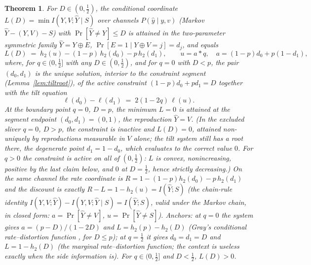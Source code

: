 \documentclass[11pt,onecolumn]{IEEEtran}
\newtheorem{theorem}{Theorem}
\newcommand{\hY}{\widehat{Y}}
\begin{document}
\begin{theorem}
\label{thm:binary}
For $D\in(0,\tfrac12)$, the conditional coordinate
$L(D)=\min I(Y,V;\hY\mid S)$ over channels $P(\hat y\mid y,v)$
(Markov $\hY-(Y,V)-S$) with $\Pr[\hY\ne Y]\le D$ is attained in
the two-parameter symmetric family $\hY=Y\oplus E$,
$\Pr[E=1\mid Y\oplus V=j]=d_j$, and equals
\[
L(D)\;=\;h_2(u)-(1-p)\,h_2(d_0)-p\,h_2(d_1),\qquad
u=a*q,\quad a=(1-p)d_0+p(1-d_1),
\]
where, for $q\in(0,\tfrac12]$ with any $D\in(0,\tfrac12)$, and for $q=0$
with $D<p$, the pair $(d_0,d_1)$ is the \emph{unique} solution, interior
to the constraint segment (Lemma~\ref{lem:tiltroot}), of the active
constraint $(1-p)d_0+pd_1=D$ together with the \emph{tilt equation}
\[
\ell(d_0)-\ell(d_1)\;=\;2(1-2q)\,\ell(u).
\]
At the boundary point $q=0$, $D=p$, the minimum $L=0$ is attained at
the segment endpoint $(d_0,d_1)=(0,1)$, the reproduction
$\hY=V$.
(In the excluded sliver $q=0$, $D>p$, the constraint is inactive and
$L(D)=0$, attained non-uniquely by reproductions measurable in $V$ alone; the
tilt system still has a root there, the degenerate point $d_1=1-d_0$,
which evaluates to the correct value $0$. For $q>0$ the constraint is
active on all of $(0,\tfrac12)$: $L$ is convex, nonincreasing, positive
by the last claim below, and $0$ at $D=\tfrac12$, hence strictly
decreasing.)
On the same channel the rate coordinate is $R=1-(1-p)h_2(d_0)-p\,h_2(d_1)$
and the discount is exactly $R-L=1-h_2(u)=I(\hY;S)$ (the chain-rule
identity $I(Y,V;\hY)-I(Y,V;\hY\mid S)=I(\hY;S)$, valid under the
Markov chain, in closed form: $a=\Pr[\hY\ne V]$,
$u=\Pr[\hY\ne S]$). Anchors: at $q=0$ the system gives
$a=(p-D)/(1-2D)$ and $L=h_2(p)-h_2(D)$ (Gray's conditional
rate--distortion function \cite{gray1973}, for $D\le p$); at $q=\tfrac12$
it gives $d_0=d_1=D$ and $L=1-h_2(D)$ (the marginal rate--distortion
function; the context is useless exactly when the side information is).
For $q\in(0,\tfrac12]$ and $D<\tfrac12$, $L(D)>0$.
\end{theorem}
\end{document}

